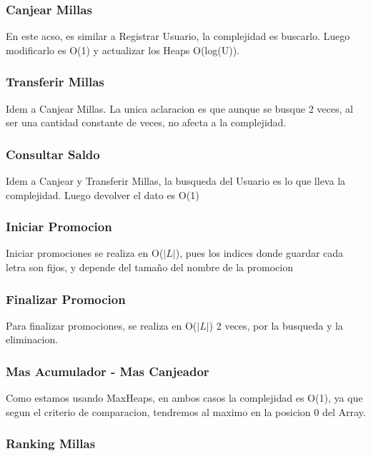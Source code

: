 \documentclass[11pt,a4paper]{article}
\begin{document}
\subsubsection{Canjear Millas}

En este acso, es similar a Registrar Usuario, la complejidad es buscarlo. Luego modificarlo es O(1) y actualizar los Heaps O(log(U)).

\subsubsection{Transferir Millas}

Idem a Canjear Millas. La unica aclaracion es que aunque se busque 2 veces, al ser una cantidad constante de veces, no afecta a la complejidad.

\subsubsection{Consultar Saldo}

Idem a Canjear y Transferir Millas, la busqueda del Usuario es lo que lleva la complejidad. Luego devolver el dato es O(1)

\subsubsection{Iniciar Promocion}

Iniciar promociones se realiza en O($|L|$), pues los indices donde guardar cada letra son fijos, y depende del tamaño del nombre de la promocion

\subsubsection{Finalizar Promocion}

Para finalizar promociones, se realiza en O($|L|$) 2 veces, por la busqueda y la eliminacion.

\subsubsection{Mas Acumulador - Mas Canjeador}

Como estamos usando MaxHeaps, en ambos casos la complejidad es O(1), ya que segun el criterio de comparacion, tendremos al maximo en la posicion 0 del Array.

\subsubsection{Ranking Millas}
\end{document}
